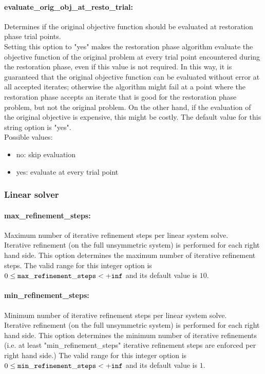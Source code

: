 \paragraph{evaluate\_orig\_obj\_at\_resto\_trial:} Determines if the original objective function should be evaluated at restoration phase trial points. $\;$ \\
 Setting this option to "yes" makes the
restoration phase algorithm evaluate the
objective function of the original problem at
every trial point encountered during the
restoration phase, even if this value is not
required.  In this way, it is guaranteed that the
original objective function can be evaluated
without error at all accepted iterates; otherwise
the algorithm might fail at a point where the
restoration phase accepts an iterate that is good
for the restoration phase problem, but not the
original problem.  On the other hand, if the
evaluation of the original objective is
expensive, this might be costly.
The default value for this string option is "yes".
\\ 
Possible values:
\begin{itemize}
   \item no: skip evaluation
   \item yes: evaluate at every trial point
\end{itemize}

\subsubsection{Linear solver}

\paragraph{max\_refinement\_steps:} Maximum number of iterative refinement steps per linear system solve. $\;$ \\
 Iterative refinement (on the full unsymmetric
system) is performed for each right hand side. 
This option determines the maximum number of
iterative refinement steps. The valid range for this integer option is
$0 \le {\tt max\_refinement\_steps } <  {\tt +inf}$
and its default value is $10$.


\paragraph{min\_refinement\_steps:} Minimum number of iterative refinement steps per linear system solve. $\;$ \\
 Iterative refinement (on the full unsymmetric
system) is performed for each right hand side. 
This option determines the minimum number of
iterative refinements (i.e. at least
"min\_refinement\_steps" iterative refinement
steps are enforced per right hand side.) The valid range for this integer option is
$0 \le {\tt min\_refinement\_steps } <  {\tt +inf}$
and its default value is $1$.

